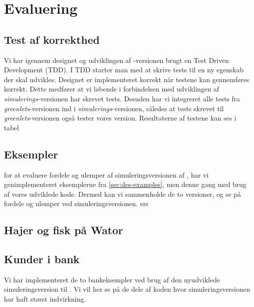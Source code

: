 \section{Evaluering}
\subsection{Test af korrekthed}
  Vi har igennem designet og udviklingen af -versionen brugt en Test Driven Development (TDD). I TDD starter man med at skrive tests til en ny egenskab der skal udvikles. Designet er implementeret korrekt når testene kan gennemføres korrekt. Dette medfører at vi løbende i forbindelsen med udviklingen af \emph{simulerings}-versionen har skrevet tests. Desuden har vi integreret alle tests fra \emph{greenlets}-versionen ind i \emph{simulerings}-versionen, således at tests skrevet til \emph{greenlets}-versionen også tester vores version. Resultaterne af testene kan ses i tabel 
  
\subsection{Eksempler}
for at evaluere fordele og ulemper af simuleringsversionen af \pycsp, har vi genimplementeret eksemplerne fra \cref{sec:des-examples}, men denne gang med  brug af vores udviklede kode. Dermed kan vi sammenholde de to versioner, og se på fordele og ulemper ved simuleringsversionen.
ers


\subsection{Hajer og fisk på Wator}


\subsection{Kunder i bank}
Vi har implementeret de to bankeksempler ved brug af den nyudviklede simuleringsversion til \pycsp. Vi vil her se på de dele af koden hvor simuleringsversionen har haft størst indvirkning. 

